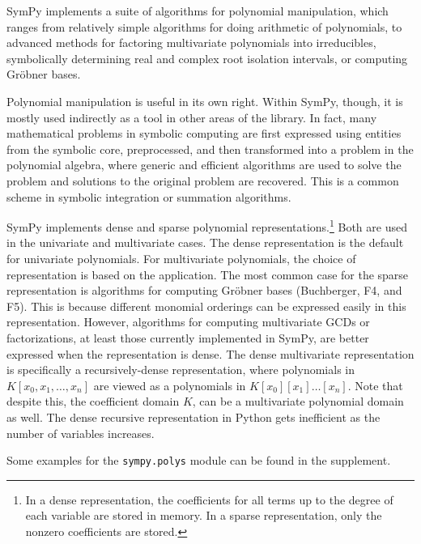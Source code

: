 
SymPy implements a suite of algorithms for polynomial manipulation,
which ranges from relatively simple algorithms for doing arithmetic of
polynomials, to advanced methods for factoring multivariate polynomials
into irreducibles, symbolically determining real and complex root isolation
intervals, or computing Gr\"{o}bner bases.

Polynomial manipulation is useful in its own right. Within SymPy, though, it is mostly used
indirectly as a tool in other areas of the library. In fact, many mathematical
problems in symbolic computing are first expressed using entities from the
symbolic core, preprocessed, and then transformed into a problem in the
polynomial algebra, where generic and efficient algorithms are used to solve
the problem and solutions to the original problem are recovered.
This is a common scheme in symbolic integration or summation algorithms.

SymPy implements dense and sparse polynomial representations.\footnote{In a
dense representation, the coefficients for all terms up to the degree of each
variable are stored in memory. In a sparse representation, only the nonzero
coefficients are stored.} Both are used in the univariate and multivariate
cases. The dense representation is the default for univariate polynomials. For
multivariate polynomials, the choice of representation is based on the
application. The most common case for the sparse representation is algorithms
for computing Gr\"{o}bner bases (Buchberger, F4, and F5).
This is
because different monomial orderings can be expressed easily in this
representation. However, algorithms for computing multivariate GCDs or
factorizations, at least those currently implemented in SymPy,
are better expressed when the representation is dense. The dense multivariate
representation is specifically a recursively-dense representation, where
polynomials in $K[x_0, x_1, \dotsc, x_n]$ are viewed as a polynomials in
$K[x_0][x_1]\dotso[x_n]$. Note that despite this, the coefficient domain $K$,
can be a multivariate polynomial domain as well. The dense recursive
representation in Python gets inefficient as the number of variables increases.

Some examples for the \texttt{sympy.polys} module can be found in the
supplement.
